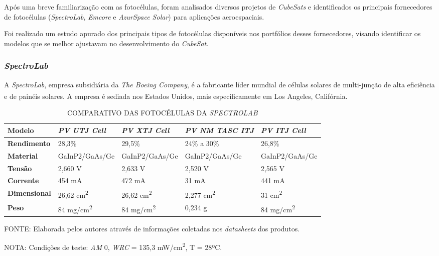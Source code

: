 \documentclass[
	12pt,				%
	openright,			%
	oneside,			%
	a4paper,			%
	english,			%
	french,				%
	spanish,			%
	brazil,				%
	oldfontcommands
	]{abntex2}
\begin{document}
	Após uma breve familiarização com as fotocélulas, foram analisados diversos projetos de \textit{CubeSats} e identificados os principais fornecedores de fotocélulas (\textit{SpectroLab}, \textit{Emcore} e \textit{AzurSpace Solar}) para aplicações aeroespaciais.
	
	Foi realizado um estudo apurado dos principais tipos de fotocélulas disponíveis nos portfólios desses fornecedores, visando identificar os modelos que se melhor ajustavam no desenvolvimento do \textit{CubeSat}.
	
\subsubsection[SpectroLab]{\textit{SpectroLab}}
	
	A \textit{SpectroLab}, empresa subsidiária da \textit{The Boeing Company}, é a fabricante líder mundial de células solares de multi-junção de alta eficiência e de painéis solares. A empresa é sediada nos Estados Unidos, mais especificamente em Los Angeles, Califórnia.\textsuperscript{\cite{SpectroLab}}
	
	\begin{table}[th]
	\caption{COMPARATIVO DAS FOTOCÉLULAS DA \textit{SPECTROLAB}}
	\begin{tabular}{p{2.5cm}|p{3.1cm}|p{3.1cm}|p{3.1cm}|p{3.1cm}}
		\textbf{Modelo} & \textit{\textbf{PV UTJ Cell}} & \textit{\textbf{PV XTJ Cell}} & \textit{\textbf{PV NM TASC ITJ}} & \textit{\textbf{PV ITJ Cell}} \\
		\hline
		\textbf{Rendimento} & 28,3\% & 29,5\% & 24\% a 30\% & 26,8\% \\
		\hline
		\textbf{Material} & GaInP2/GaAs/Ge & GaInP2/GaAs/Ge & GaInP2/GaAs/Ge & GaInP2/GaAs/Ge\\
		\hline
		\textbf{Tensão} & 2,660 V & 2,633 V & 2,520 V & 2,565 V\\
		\hline
		\textbf{Corrente} & 454 mA & 472 mA & 31 mA & 441 mA\\
		\hline
		\textbf{Dimensional} & 26,62 cm\textsuperscript{2} & 26,62 cm\textsuperscript{2} & 2,277 cm\textsuperscript{2} & 31 cm\textsuperscript{2}\\
		\hline
		\textbf{Peso} & 84 mg/cm\textsuperscript{2} & 84 mg/cm\textsuperscript{2} & 0,234 g & 84 mg/cm\textsuperscript{2}\\
	\end{tabular}
	
	\begin{small}
	\vspace{3pt}
		FONTE: Elaborada pelos autores através de informações coletadas nos \textit{datasheets} dos produtos.
	\end{small}
	\begin{footnotesize}
		NOTA: Condições de teste: \textit{AM} 0, \textit{WRC} = 135,3 mW/cm\textsuperscript{2}, T = 28ºC.
	\end{footnotesize}
	\end{table}
	
\end{document}
